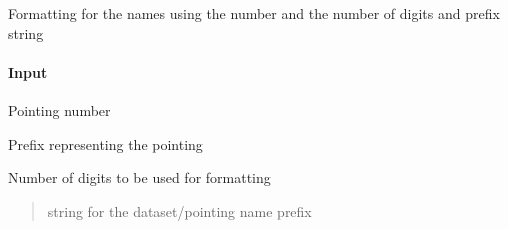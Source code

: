 \documentclass[letterpaper,10pt,english]{sphinxmanual}
\begin{document}
\begin{fulllineitems}
\label{\detokenize{api/pymusepipe:pymusepipe.util_pipe.get_pointing_name}}
\pysigstartsignatures
{}
\pysigstopsignatures
\sphinxAtStartPar
Formatting for the names using the number and
the number of digits and prefix string


\paragraph{Input}
\label{\detokenize{api/pymusepipe:id170}}\begin{description}
\sphinxAtStartPar
Pointing number

\sphinxAtStartPar
Prefix representing the pointing

\sphinxAtStartPar
Number of digits to be used for formatting

\end{description}
\begin{quote}\begin{description}
\sphinxAtStartPar
string for the dataset/pointing name prefix

\end{description}\end{quote}

\end{fulllineitems}

\end{document}
